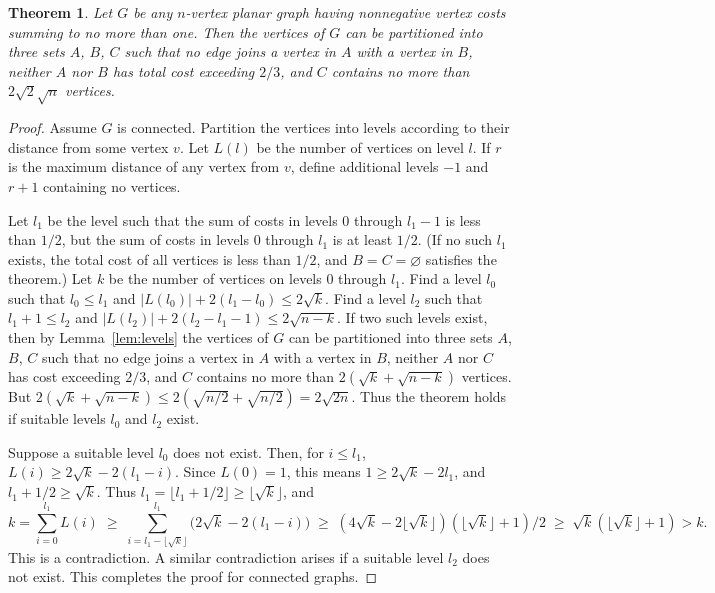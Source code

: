 \documentclass[12pt]{article}
\newtheorem{theorem}{Theorem}
\theoremstyle{remark}
\begin{document}
\begin{theorem}
\label{thm:main}
Let $G$ be any $n$-vertex planar graph having nonnegative vertex costs summing to
no more than one. Then the vertices of $G$ can be partitioned into three sets $A$,
$B$, $C$ such that no edge joins a vertex in $A$ with a vertex in $B$, neither $A$
nor $B$ has total cost exceeding $2/3$, and $C$ contains no more than
$2\sqrt{2}\sqrt{n}$ vertices.
\end{theorem}

\begin{proof}
Assume $G$ is connected. Partition the vertices into levels according to their
distance from some vertex $v$. Let $L(l)$ be the number of vertices on level $l$. If
$r$ is the maximum distance of any vertex from $v$, define additional levels $-1$
and $r+1$ containing no vertices.

Let $l_1$ be the level such that the sum of costs in levels $0$ through $l_1 - 1$ is
less than $1/2$, but the sum of costs in levels $0$ through $l_1$ is at least $1/2$.
(If no such $l_1$ exists, the total cost of all vertices is less than $1/2$, and
$B = C = \varnothing$ satisfies the theorem.) Let $k$ be the number of vertices on
levels $0$ through $l_1$. Find a level $l_0$ such that $l_0 \leq l_1$ and
$|L(l_0)| + 2(l_1 - l_0) \leq 2\sqrt{k}$. Find a level $l_2$ such that
$l_1 + 1 \leq l_2$ and $|L(l_2)| + 2(l_2 - l_1 - 1) \leq 2\sqrt{n-k}$.
If two such levels exist, then by Lemma~\ref{lem:levels} the vertices of $G$ can be
partitioned into three sets $A$, $B$, $C$ such that no edge joins a vertex in $A$
with a vertex in $B$, neither $A$ nor $C$ has cost exceeding $2/3$, and $C$ contains
no more than $2(\sqrt{k} + \sqrt{n-k})$ vertices. But
$2(\sqrt{k} + \sqrt{n-k}) \leq 2(\sqrt{n/2} + \sqrt{n/2}) = 2\sqrt{2n}$. Thus the
theorem holds if suitable levels $l_0$ and $l_2$ exist.

Suppose a suitable level $l_0$ does not exist. Then, for $i \leq l_1$,
$L(i) \geq 2\sqrt{k} - 2(l_1 - i)$. Since $L(0) = 1$, this means
$1 \geq 2\sqrt{k} - 2l_1$, and $l_1 + 1/2 \geq \sqrt{k}$. Thus
$l_1 = \lfloor l_1 + 1/2 \rfloor \geq \lfloor \sqrt{k} \rfloor$, and
\[
k = \sum_{i=0}^{l_1} L(i) \;\geq\; \sum_{i=l_1 - \lfloor\sqrt{k}\rfloor}^{l_1}
\bigl(2\sqrt{k} - 2(l_1-i)\bigr) \;\geq\;
(4\sqrt{k} - 2\lfloor\sqrt{k}\rfloor)(\lfloor\sqrt{k}\rfloor + 1)/2
\;\geq\; \sqrt{k}(\lfloor\sqrt{k}\rfloor + 1) > k.
\]
This is a contradiction. A similar contradiction arises if a suitable level $l_2$
does not exist. This completes the proof for connected graphs.


\end{proof}
\end{document}
